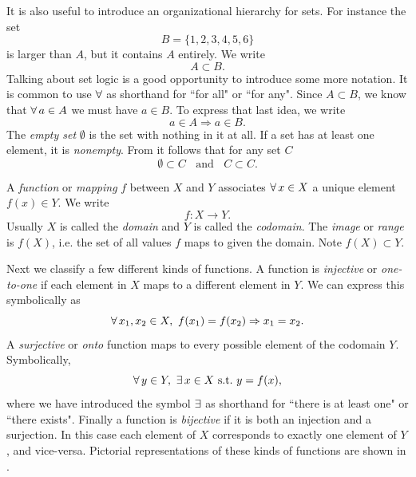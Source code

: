 It is also useful to introduce an organizational hierarchy for sets. For
instance the set
\begin{equation}
  B=\{1,2,3,4,5,6\}
\end{equation}
is larger than $A$, but it contains $A$ entirely. We write
\begin{equation}
A\subset B.
\end{equation}
Talking about set logic is a good opportunity to introduce some more notation.
It is common to use $\operatorname{\forall}$ as shorthand for ``for all" or ``for any".
Since $A\subset B$, we know that $\operatorname{\forall} a\in A$ we must have $a\in B$.
To express that last idea, we write
\begin{equation}\label{eq:subsetIn}
a\in A\Rightarrow a\in B.
\end{equation}
The {\it empty set} $\emptyset$ is the set with nothing in it
at all. If a set has at least one element, it is {\it nonempty}.
From  it follows that for any set $C$
\begin{equation}
\emptyset\subset C~~~~\text{and}~~~~C\subset C.
\end{equation}


A
{\it function} or {\it mapping} $f$ between $X$ and $Y$
associates $\operatorname{\forall} x\in X$ a unique element $f(x)\in Y$. We
write
\begin{equation}
f:X\to Y.
\end{equation}
Usually $X$ is called the {\it domain}
and $Y$ is called the {\it codomain}.
The {\it image} or {\it range}
is $f(X)$, i.e. the set of all values $f$
maps to given the domain. Note $f(X)\subset Y$.

Next we classify a few different kinds of functions.
A function is {\it injective}
or {\it one-to-one} if each element in $X$
maps to a different element in $Y$. We can express this symbolically as
\begin{equation}
 \operatorname{\forall} x_1,x_2\in X,~f(x_1)=f(x_2)\Rightarrow x_1=x_2.
\end{equation}
A {\it surjective} or {\it onto} function
maps to every possible element of the codomain $Y$. Symbolically,
\begin{equation}
 \operatorname{\forall} y\in Y,~\operatorname{\exists} x\in X ~\text{s.t.}~ y=f(x), 
\end{equation}
where we have introduced the symbol $\operatorname{\exists}$ as shorthand for ``there is at
least one" or ``there exists". Finally a function is
{\it bijective} if it is both an injection and a surjection. In this case each
element of $X$ corresponds to exactly one element of $Y$, and vice-versa.
Pictorial representations of these kinds of functions are shown in
.


